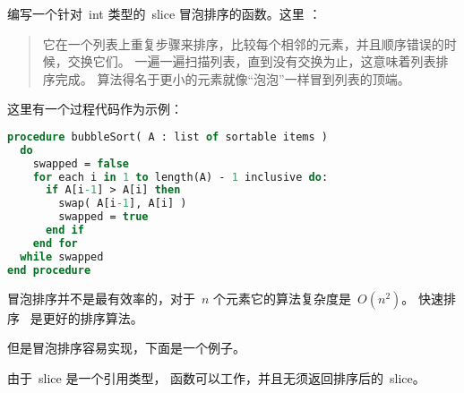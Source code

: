 \begin{Exercise}[title={冒泡排序},difficulty=5]
\label{ex:bubble}
\Question\label{ex:bubble q1} 编写一个针对~int 类型的~slice 冒泡排序的函数。这里 \cite{bubblesort}：
\begin{quote}
它在一个列表上重复步骤来排序，比较每个相邻的元素，并且顺序错误的时候，交换它们。
一遍一遍扫描列表，直到没有交换为止，这意味着列表排序完成。
算法得名于更小的元素就像``泡泡''一样冒到列表的顶端。
\end{quote}

\cite{bubblesort} 这里有一个过程代码作为示例：
\begin{lstlisting}[language=pascal]
procedure bubbleSort( A : list of sortable items )
  do
    swapped = false
    for each i in 1 to length(A) - 1 inclusive do:
      if A[i-1] > A[i] then
        swap( A[i-1], A[i] )
        swapped = true
      end if
    end for
  while swapped
end procedure
\end{lstlisting}
\end{Exercise}

\begin{Answer}
\Question 
冒泡排序并不是最有效率的，对于~$n$ 个元素它的算法复杂度是~$O(n^2)$。
快速排序~\cite{quicksort} 是更好的排序算法。

但是冒泡排序容易实现，下面是一个例子。


由于~slice 是一个引用类型， 函数可以工作，并且无须返回排序后的~slice。
\end{Answer}
